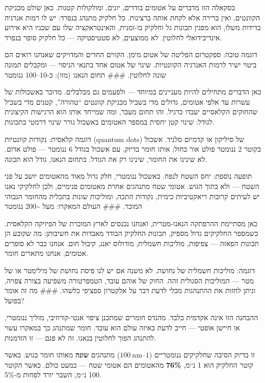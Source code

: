 \documentclass[
  hebrew,
  letterpaper,
  DIV=11,
  numbers=noendperiod]{scrreprt}
\begin{document}
בסקאלה הזו מדברים על אטומים בודדים, יונים, ומולקולות קטנות. כאן שולט
מכניקת הקוונטים, ואין ברירה אלא לקחת אותה ברצינות. כל חלקיק מתנהג בנפרד:
יש לו רמות אנרגיה בדידות משלו, הוא מפגין תכונות גל וחלקיק בו-זמנית,
והאינטראקציה שלו עם שכניו היא אירוע אינדיבידואלי לחלוטין. לא ממוצעים, לא
סטטיסטיקה --- כל חלקיק סופר בנפרד.

דוגמה טובה: ספקטרום הפליטה של אטום מימן. הקווים החדים והמדויקים שאנחנו
רואים הם ביטוי ישיר לרמות האנרגיה הקוונטיות. שינוי של אטום אחד בתנאי
הניסוי --- ומקבלים תמונה שונה לחלוטין. \#\#\# תחום הנאנו (מזו):
כ-10--100 ננומטר

כאן הדברים מתחילים להיות מעניינים במיוחד --- ולפעמים גם מבלבלים. מדובר
באשכולות של עשרות עד אלפי אטומים, גדולים מדי בשביל מכניקת קוונטים
``טהורה'', קטנים מדי בשביל שהחוקים הקלאסיים יעבדו כרגיל. זהו תחום מעבר,
ומה שמייחד אותו הוא הרגישות הקיצונית לגודל: שינוי קטן יחסית במספר
האטומים באשכול גורר שינוי דרמטי בתכונות.

דוגמה קלאסית: נקודות קוונטיות (quantum dots) של סיליקון או קדמיום סלניד.
אשכול בקוטר 2 ננומטר פולט אור כחול; אותו חומר בדיוק, עם אשכול בגודל 6
ננומטר --- פולט אדום. לא שינינו את החומר, שינינו רק את הגודל. בתחום
הנאנו, גודל הוא תכונה.

תופעה נוספת: יחס השטח לנפח. באשכול ננומטרי, חלק גדול מאוד מהאטומים יושב
על פני השטח --- ולא בתוך הגוש. אטומי שטח מתנהגים אחרת מאטומים פנימיים,
ולכן לחלקיקי נאנו יש לעיתים קרובות ריאקטיביות כימית, נקודות התכה,
ומוליכות שונות בתכלית מהחומר הגבוהי המוכר. \#\#\# העולם המאקרו: מעל
\textasciitilde200 ננומטר

כאן מסתיימת ההרפתקה הנאנו-מטרית, ואנחנו נכנסים לארץ המוכרת של הפיזיקה
הקלאסית. כשמספר החלקיקים גדול מספיק, תכונות החלקיק הבודד מאבדות את
חשיבותן: מה שקובע הן תכונות הפאזה --- צפיפות, מוליכות חשמלית, מודולוס
יאנג, קיבול חום. אנחנו כבר לא סופרים אטומים, אנחנו מתארים חומר.

דוגמה: מוליכות חשמלית של נחושת. לא משנה אם יש לנו פיסת נחושת של מילימטר
או של מטר --- המוליכות הסגולית זהה. החוק של אוהם עובד, הטמפרטורה משפיעה
בצורה צפויה, וניתן לחזות את ההתנהגות מבלי לדעת דבר על אלקטרון ספציפי
כלשהו. \#\#\# מה זה אומר בפועל?

ההבחנה הזו אינה אקדמית בלבד. מהנדס חומרים שמתכנן ציפוי אנטי-קורוזיבי,
מוליך ננומטרי, או חיישן אופטי --- חייב לדעת באיזה עולם הוא עובד. חומר
שמתנהג כך במאקרו עשוי להתנהג הפוך לחלוטין בנאנו. זה לא פגם --- זו
הזדמנות.

זו בדיוק הסיבה שחלקיקים ננומטריים (\(1\)--\(100\ \text{nm}\)) מתנהגים
\textbf{שונה} מאותו חומר בגוש. כאשר קוטר החלקיק הוא 1 נ׳׳מ,
\textbf{76\%} מהאטומים הם אטומי שטח --- כמעט כולם. כאשר הקוטר 100 נ׳׳מ,
השבר יורד לפחות מ-5\%.
\end{document}
